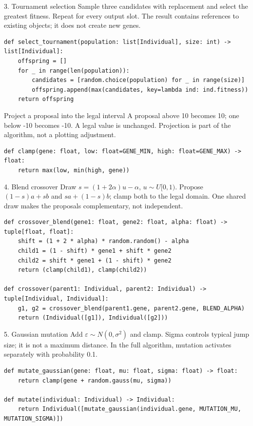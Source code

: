\begin{frame}[fragile]{3. Tournament selection}
Sample three candidates with replacement and select the greatest fitness. Repeat for every output slot. The result contains references to existing objects; it does not create new genes.

\begin{lstlisting}
def select_tournament(population: list[Individual], size: int) -> list[Individual]:
    offspring = []
    for _ in range(len(population)):
        candidates = [random.choice(population) for _ in range(size)]
        offspring.append(max(candidates, key=lambda ind: ind.fitness))
    return offspring
\end{lstlisting}
\end{frame}
\begin{frame}[fragile]{Project a proposal into the legal interval}
A proposal above 10 becomes 10; one below -10 becomes -10. A legal value is unchanged. Projection is part of the algorithm, not a plotting adjustment.

\begin{lstlisting}
def clamp(gene: float, low: float=GENE_MIN, high: float=GENE_MAX) -> float:
    return max(low, min(high, gene))
\end{lstlisting}
\end{frame}
\begin{frame}[fragile]{4. Blend crossover}
Draw $s=(1+2\alpha)u-\alpha$, $u\sim U[0,1)$. Propose $(1-s)a+sb$ and $sa+(1-s)b$; clamp both to the legal domain. One shared draw makes the proposals complementary, not independent.

\begin{lstlisting}
def crossover_blend(gene1: float, gene2: float, alpha: float) -> tuple[float, float]:
    shift = (1 + 2 * alpha) * random.random() - alpha
    child1 = (1 - shift) * gene1 + shift * gene2
    child2 = shift * gene1 + (1 - shift) * gene2
    return (clamp(child1), clamp(child2))

def crossover(parent1: Individual, parent2: Individual) -> tuple[Individual, Individual]:
    g1, g2 = crossover_blend(parent1.gene, parent2.gene, BLEND_ALPHA)
    return (Individual([g1]), Individual([g2]))
\end{lstlisting}
\end{frame}
\begin{frame}[fragile]{5. Gaussian mutation}
Add $\varepsilon\sim N(0,\sigma^2)$ and clamp. Sigma controls typical jump size; it is not a maximum distance. In the full algorithm, mutation activates separately with probability 0.1.

\begin{lstlisting}
def mutate_gaussian(gene: float, mu: float, sigma: float) -> float:
    return clamp(gene + random.gauss(mu, sigma))

def mutate(individual: Individual) -> Individual:
    return Individual([mutate_gaussian(individual.gene, MUTATION_MU, MUTATION_SIGMA)])
\end{lstlisting}
\end{frame}
